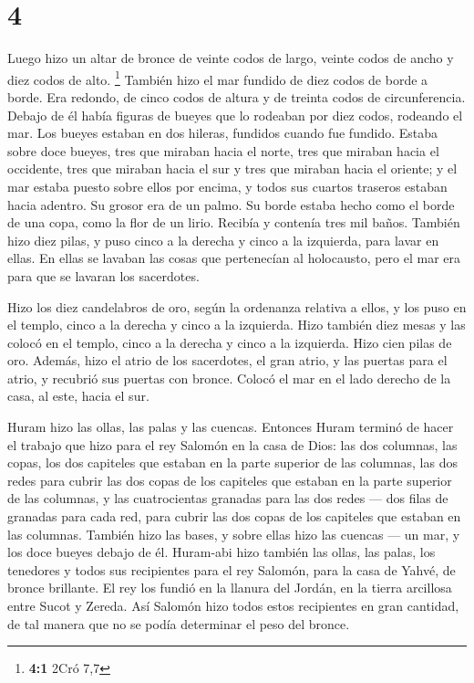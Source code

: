 \hypertarget{section-3}{%
\section{4}\label{section-3}}

 Luego hizo un altar de bronce de veinte codos de largo,
veinte codos de ancho y diez codos de alto. \footnote{\textbf{4:1} 2Cró
  7,7}  También hizo el mar fundido de diez codos de borde
a borde. Era redondo, de cinco codos de altura y de treinta codos de
circunferencia.  Debajo de él había figuras de bueyes que
lo rodeaban por diez codos, rodeando el mar. Los bueyes estaban en dos
hileras, fundidos cuando fue fundido.  Estaba sobre doce
bueyes, tres que miraban hacia el norte, tres que miraban hacia el
occidente, tres que miraban hacia el sur y tres que miraban hacia el
oriente; y el mar estaba puesto sobre ellos por encima, y todos sus
cuartos traseros estaban hacia adentro.  Su grosor era de
un palmo. Su borde estaba hecho como el borde de una copa, como la flor
de un lirio. Recibía y contenía tres mil baños.  También
hizo diez pilas, y puso cinco a la derecha y cinco a la izquierda, para
lavar en ellas. En ellas se lavaban las cosas que pertenecían al
holocausto, pero el mar era para que se lavaran los sacerdotes.

 Hizo los diez candelabros de oro, según la ordenanza
relativa a ellos, y los puso en el templo, cinco a la derecha y cinco a
la izquierda.  Hizo también diez mesas y las colocó en el
templo, cinco a la derecha y cinco a la izquierda. Hizo cien pilas de
oro.  Además, hizo el atrio de los sacerdotes, el gran
atrio, y las puertas para el atrio, y recubrió sus puertas con bronce.
 Colocó el mar en el lado derecho de la casa, al este,
hacia el sur.

 Huram hizo las ollas, las palas y las cuencas. Entonces
Huram terminó de hacer el trabajo que hizo para el rey Salomón en la
casa de Dios:  las dos columnas, las copas, los dos
capiteles que estaban en la parte superior de las columnas, las dos
redes para cubrir las dos copas de los capiteles que estaban en la parte
superior de las columnas,  y las cuatrocientas granadas
para las dos redes --- dos filas de granadas para cada red, para cubrir
las dos copas de los capiteles que estaban en las columnas.
 También hizo las bases, y sobre ellas hizo las cuencas
---  un mar, y los doce bueyes debajo de él.
 Huram-abi hizo también las ollas, las palas, los
tenedores y todos sus recipientes para el rey Salomón, para la casa de
Yahvé, de bronce brillante.  El rey los fundió en la
llanura del Jordán, en la tierra arcillosa entre Sucot y Zereda.
 Así Salomón hizo todos estos recipientes en gran
cantidad, de tal manera que no se podía determinar el peso del bronce.

